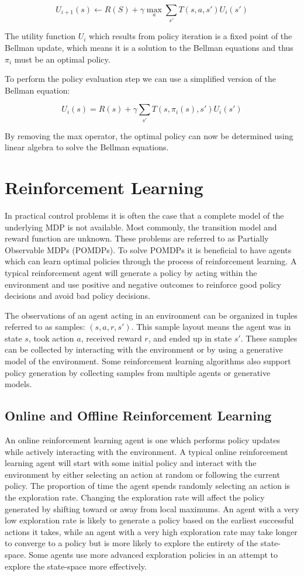 \[
    U_{i+1}(s) \gets R(S) + \gamma \max_a \sum_{s'}T(s,a,s')U_i(s')
\]

The utility function $U_i$ which results from policy iteration is a fixed point of the Bellman update, which means it is a solution to the Bellman equations and thus $\pi_i$ must be an optimal policy.

To perform the policy evaluation step we can use a simplified version of the Bellman equation:

\[
    U_i(s) = R(s) + \gamma \sum_{s'} T(s, \pi_i(s), s')U_i(s')
\]

By removing the max operator, the optimal policy can now be determined using linear algebra to solve the Bellman equations.

\section{Reinforcement Learning}

In practical control problems it is often the case that a complete model of the underlying MDP is not available. \cite{lspi} Most commonly, the transition model and reward function are unknown. These problems are referred to as Partially Observable MDPs (POMDPs). \cite{norvig} To solve POMDPs it is beneficial to have agents which can learn optimal policies through the process of reinforcement learning. A typical reinforcement agent will generate a policy by acting within the environment and use positive and negative outcomes to reinforce good policy decisions and avoid bad policy decisions.

The observations of an agent acting in an environment can be organized in tuples referred to as samples: $(s, a, r, s')$. This sample layout means the agent was in state $s$, took action $a$, received reward $r$, and ended up in state $s'$. These samples can be collected by interacting with the environment or by using a generative model of the environment. Some reinforcement learning algorithms also support policy generation by collecting samples from multiple agents or generative models.

\subsection{Online and Offline Reinforcement Learning}

An online reinforcement learning agent is one which performs policy updates while actively interacting with the environment. A typical online reinforcement learning agent will start with some initial policy and interact with the environment by either selecting an action at random or following the current policy. The proportion of time the agent spends randomly selecting an action is the exploration rate. Changing the exploration rate will affect the policy generated by shifting toward or away from local maximums. An agent with a very low exploration rate is likely to generate a policy based on the earliest successful actions it takes, while an agent with a very high exploration rate may take longer to converge to a policy but is more likely to explore the entirety of the state-space. Some agents use more advanced exploration policies in an attempt to explore the state-space more effectively.

